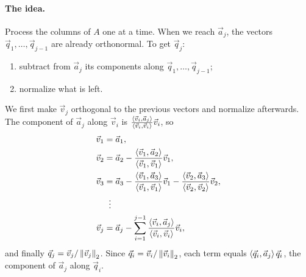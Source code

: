 \paragraph{The idea.} Process the columns of $A$ one at a time. When we reach $\vec{a}_j$, the vectors $\vec{q}_1, \dots, \vec{q}_{j-1}$ are already orthonormal. To get $\vec{q}_j$:
\begin{enumerate}
  \item subtract from $\vec{a}_j$ its components along $\vec{q}_1, \dots, \vec{q}_{j-1}$;
  \item normalize what is left.
\end{enumerate}
We first make $\vec{v}_j$ orthogonal to the previous vectors and normalize afterwards. The component of $\vec{a}_j$ along $\vec{v}_i$ is $\frac{\left\langle \vec{v}_i, \vec{a}_j \right\rangle}{\left\langle \vec{v}_i, \vec{v}_i \right\rangle}\vec{v}_i$, so
\begin{equation}
  \label{eq:cgs}
  \begin{aligned}
    \vec{v}_1 &= \vec{a}_1, \\
    \vec{v}_2 &= \vec{a}_2 - \frac{\left\langle \vec{v}_1, \vec{a}_2 \right\rangle}{\left\langle \vec{v}_1, \vec{v}_1 \right\rangle}\vec{v}_1, \\
    \vec{v}_3 &= \vec{a}_3 - \frac{\left\langle \vec{v}_1, \vec{a}_3 \right\rangle}{\left\langle \vec{v}_1, \vec{v}_1 \right\rangle}\vec{v}_1 - \frac{\left\langle \vec{v}_2, \vec{a}_3 \right\rangle}{\left\langle \vec{v}_2, \vec{v}_2 \right\rangle}\vec{v}_2, \\
    &\;\;\vdots \\
    \vec{v}_j &= \vec{a}_j - \sum_{i=1}^{j-1}\frac{\left\langle \vec{v}_i, \vec{a}_j \right\rangle}{\left\langle \vec{v}_i, \vec{v}_i \right\rangle}\vec{v}_i,
  \end{aligned}
\end{equation}
and finally $\vec{q}_j = \vec{v}_j/\left\lVert \vec{v}_j \right\rVert_2$. Since $\vec{q}_i = \vec{v}_i/\left\lVert \vec{v}_i \right\rVert_2$, each term equals $\left\langle \vec{q}_i, \vec{a}_j \right\rangle\vec{q}_i$, the component of $\vec{a}_j$ along $\vec{q}_i$.

